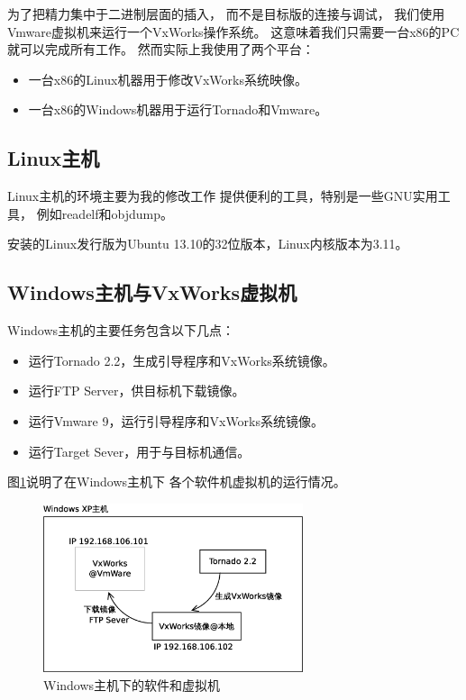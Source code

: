 为了把精力集中于二进制层面的插入，
而不是目标版的连接与调试，
我们使用Vmware虚拟机来运行一个VxWorks操作系统。
这意味着我们只需要一台x86的PC就可以完成所有工作。
然而实际上我使用了两个平台：
\begin{itemize}
  \item 一台x86的Linux机器用于修改VxWorks系统映像。
  \item 一台x86的Windows机器用于运行Tornado和Vmware。
\end{itemize}

\subsection{Linux主机}

Linux主机的环境主要为我的修改工作
提供便利的工具，特别是一些GNU实用工具，
例如readelf和objdump。

安装的Linux发行版为Ubuntu 13.10的32位版本，Linux内核版本为3.11。

\subsection{Windows主机与VxWorks虚拟机}

Windows主机的主要任务包含以下几点：

\begin{itemize}
  \item 运行Tornado 2.2，生成引导程序和VxWorks系统镜像。
  \item 运行FTP Server，供目标机下载镜像。
  \item 运行Vmware 9，运行引导程序和VxWorks系统镜像。
  \item 运行Target Sever，用于与目标机通信。
\end{itemize}

图\ref{win}说明了在Windows主机下
各个软件机虚拟机的运行情况。

\begin{figure}[h!]
    \centering
    \includegraphics[width=0.68\textwidth]{figure/win.eps}
    \caption{Windows主机下的软件和虚拟机}
    \label{win}
\end{figure}

